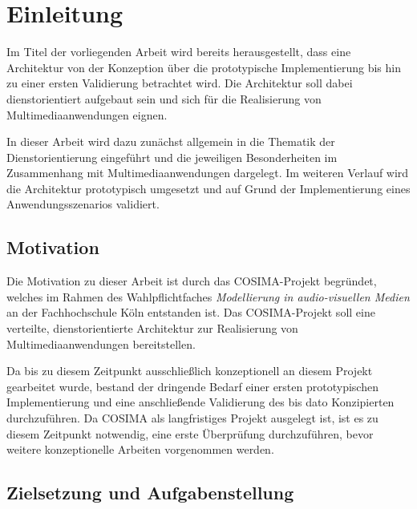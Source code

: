 
\chapter{Einleitung} %
\label{cha:einleitung}

  Im Titel der vorliegenden Arbeit wird bereits herausgestellt, dass eine Architektur von der Konzeption über die prototypische Implementierung bis hin zu einer ersten Validierung betrachtet wird. Die Architektur soll dabei dienstorientiert aufgebaut sein und sich für die Realisierung von Multimediaanwendungen eignen.
  
  In dieser Arbeit wird dazu zunächst allgemein in die Thematik der Dienstorientierung eingeführt und die jeweiligen Besonderheiten im Zusammenhang mit Multimediaanwendungen dargelegt. Im weiteren Verlauf wird die Architektur prototypisch umgesetzt und auf Grund der Implementierung eines Anwendungsszenarios validiert.

\section{Motivation} %
\label{sec:motivation}

  Die Motivation zu dieser Arbeit ist durch das COSIMA-Projekt begründet, welches im Rahmen des Wahlpflichtfaches \emph{Modellierung in audio-visuellen Medien} an der Fachhochschule Köln entstanden ist. Das COSIMA-Projekt soll eine verteilte, dienstorientierte Architektur zur Realisierung von Multimediaanwendungen bereitstellen.
  
  Da bis zu diesem Zeitpunkt ausschließlich konzeptionell an diesem Projekt gearbeitet wurde, bestand der dringende Bedarf einer ersten prototypischen Implementierung und eine anschließende Validierung des bis dato Konzipierten durchzuführen. Da COSIMA als langfristiges Projekt ausgelegt ist, ist es zu diesem Zeitpunkt notwendig, eine erste Überprüfung durchzuführen, bevor weitere konzeptionelle Arbeiten vorgenommen werden.


\section{Zielsetzung und Aufgabenstellung} %
\label{sec:zielsetzung_und_aufgabenstellung}


